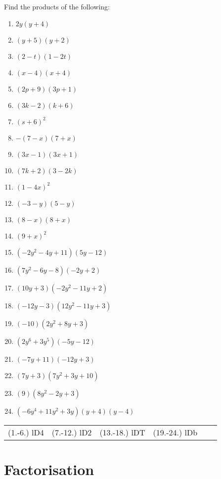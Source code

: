 \begin{exercises}{}
{
Find the products of the following:

\begin{multicols}{2}
\begin{enumerate}[label=\textbf{\arabic*}., itemsep=5pt]
\item $2y(y+4)$ 
\item $(y+5)(y+2) $
\item $(2-t)(1-2t)$
\item $(x-4)(x+4)$
\item $ (2p+9)(3p+1)$
\item $(3k-2)(k+6)$
\item $(s+6)^2$
\item $-(7-x)(7+x)$
\item $(3x-1)(3x+1)$
\item $(7k+2)(3-2k)$
\item $(1-4x)^2$
\item $(-3-y)(5-y)$
\item $(8-x)(8+x)$
\item $(9+x)^2$
\item $(-2{y}^{2}-4y+11)(5y-12)$ 
\item $(7{y}^{2}-6y-8)(-2y+2)$%
\item $(10{y}+3)(-2{y}^{2}-11y+2)$ 
\item $(-12y-3)(12{y}^{2}-11y+3)$%
\item $(-10)(2{y}^{2}+8y+3)$ 
\item $(2{y}^{6}+3{y}^{5})(-5y-12)$%
\item $(-7y+11)(-12y+3)$%
\item $(7y+3)(7{y}^{2}+3y+10)$%
\item $(9)(8{y}^{2}-2y+3)$ 
\item $(-6{y}^{4}+11{y}^{2}+3y)(y+4)(y-4)$ 
\end{enumerate}
\end{multicols}
\practiceinfo 
\par 
 \par \begin{tabular}[h]{cccccc}
 (1.-6.) lD4  &  (7.-12.) lD2  &  (13.-18.) lDT & (19.-24.) lDb   \end{tabular}
}
\end{exercises}



\section{Factorisation}


